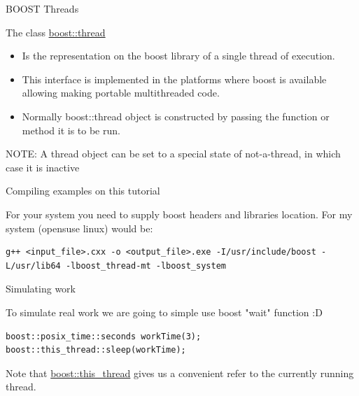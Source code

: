 \documentclass[8pt]{beamer}
\begin{document}
\begin{frame}[fragile]{BOOST Threads}
\footnotesize
 
\begin{block}{The class \uline{boost::thread}}
\footnotesize

\begin{itemize}
  \item Is the representation on the boost library of a single thread of execution. 
  \item This interface is implemented in the platforms where boost is available allowing making portable multithreaded code.
  \item Normally boost::thread object is constructed by passing the function or method it is to be run.
\end{itemize}

NOTE: A thread object can be set to a special state of not-a-thread, in which case it is inactive

\end{block}

\begin{exampleblock}{Compiling examples on this tutorial}

For your system you need to supply boost headers and libraries location. For my system (opensuse linux) would be:

\begin{lstlisting}
g++ <input_file>.cxx -o <output_file>.exe -I/usr/include/boost -L/usr/lib64 -lboost_thread-mt -lboost_system
\end{lstlisting}
\end{exampleblock}

\begin{exampleblock}{Simulating work}

To simulate real work we are going to simple use boost "wait" function :D

\begin{lstlisting}
boost::posix_time::seconds workTime(3);
boost::this_thread::sleep(workTime);
\end{lstlisting}

Note that \uline{boost::this\_thread} gives us a convenient refer to the currently running thread.

\end{exampleblock}
 
\end{frame}
\end{document}
